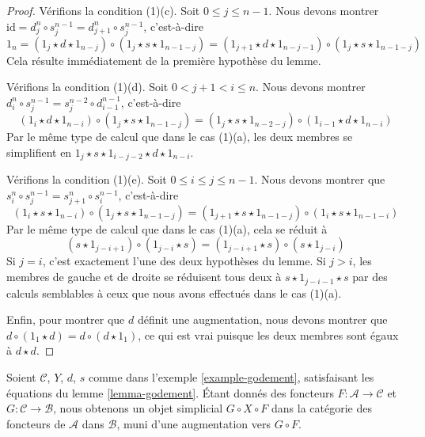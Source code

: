 \begin{proof}
\medskip\noindent
Vérifions la condition (1)(c). Soit $0 \leq j \leq n - 1$. Nous devons montrer
$\text{id} = d^n_j \circ s^{n - 1}_j = d^n_{j + 1} \circ s^{n - 1}_j$,
c'est-à-dire
$$
1_n =
(1_j \star d \star 1_{n - j}) \circ
(1_j \star s \star 1_{n - 1 - j}) =
(1_{j + 1} \star d \star 1_{n - j - 1}) \circ
(1_j \star s \star 1_{n - 1 - j})
$$
Cela résulte immédiatement de la première hypothèse du lemme.

\medskip\noindent
Vérifions la condition (1)(d). Soit $0 < j + 1 < i \leq n$. Nous devons
montrer $d^n_i \circ s^{n - 1}_j = s^{n - 2}_j \circ d^{n - 1}_{i - 1}$,
c'est-à-dire
$$
(1_i \star d \star 1_{n - i}) \circ
(1_j \star s \star 1_{n - 1 - j}) =
(1_j \star s \star 1_{n - 2 - j}) \circ
(1_{i - 1} \star d \star 1_{n - i})
$$
Par le même type de calcul que dans le cas (1)(a), les deux membres se
simplifient en $1_j \star s \star 1_{i - j - 2} \star d \star 1_{n - i}$.

\medskip\noindent
Vérifions la condition (1)(e). Soit $0 \leq i \leq j \leq n - 1$. Nous
devons montrer que
$s^n_i \circ s^{n - 1}_j = s^n_{j + 1} \circ s^{n - 1}_i$, c'est-à-dire
$$
(1_i \star s \star 1_{n - i}) \circ
(1_j \star s \star 1_{n - 1 - j}) =
(1_{j + 1} \star s \star 1_{n - 1 - j}) \circ
(1_i \star s \star 1_{n - 1 - i})
$$
Par le même type de calcul que dans le cas (1)(a), cela se réduit à
$$
(s \star 1_{j - i + 1}) \circ (1_{j - i} \star s) =
(1_{j - i + 1} \star s) \circ (s \star 1_{j - i})
$$
Si $j = i$, c'est exactement l'une des deux hypothèses du lemme.
Si $j > i$, les membres de gauche et de droite se réduisent tous deux à
$s \star 1_{j - i - 1} \star s$ par des calculs semblables à ceux que nous
avons effectués dans le cas (1)(a).

\medskip\noindent
Enfin, pour montrer que $d$ définit une augmentation, nous devons montrer que
$d \circ (1_1 \star d) = d \circ (d \star 1_1)$, ce qui est vrai puisque les
deux membres sont égaux à $d \star d$.
\end{proof}

\begin{example}
\label{example-godement-functorial}
Soient $\mathcal{C}$, $Y$, $d$, $s$ comme dans l'exemple
\ref{example-godement}, satisfaisant les équations du lemme
\ref{lemma-godement}. Étant donnés des foncteurs
$F : \mathcal{A} \to \mathcal{C}$ et $G : \mathcal{C} \to \mathcal{B}$,
nous obtenons un objet simplicial $G \circ X \circ F$ dans la catégorie des
foncteurs de $\mathcal{A}$ dans $\mathcal{B}$, muni d'une augmentation vers
$G \circ F$.
\end{example}

